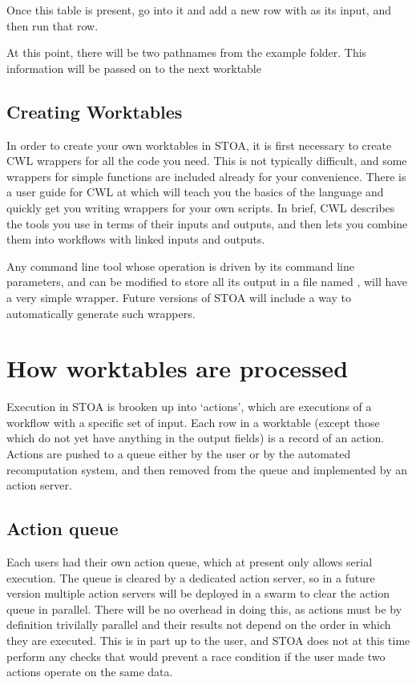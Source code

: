 \documentclass[letterpaper,10pt,english]{sphinxmanual}
\begin{document}
Once this table is present, go into it and add a new row with  as its input, and then run that row.

\noindent{}

At this point, there will be two pathnames from the example folder. This information will be passed on to the next worktable


\section{Creating Worktables}
\label{\detokenize{starting:creating-worktables}}
In order to create your own worktables in STOA, it is first necessary to create CWL wrappers for all the code you need. This is not typically difficult, and some wrappers for simple functions are included already for your convenience. There is a user guide for CWL at  which will teach you the basics of the language and quickly get you writing wrappers for your own scripts. In brief, CWL describes the tools you use in terms of their inputs and outputs, and then lets you combine them into workflows with linked inputs and outputs.

Any command line tool whose operation is driven by its command line parameters, and can be modified to store all its output in a file named , will have a very simple wrapper. Future versions of STOA will include a way to automatically generate such wrappers.


\chapter{How worktables are processed}
\label{\detokenize{process:how-worktables-are-processed}}\label{\detokenize{process::doc}}
Execution in STOA is brooken up into ‘actions’, which are executions of a workflow with a specific set of input. Each row in a worktable (except those which do not yet have anything in the output fields) is a record of an action. Actions are pushed to a queue either by the user or by the automated recomputation system, and then removed from the queue and implemented by an action server.


\section{Action queue}
\label{\detokenize{process:action-queue}}
Each users had their own action queue, which at present only allows serial execution. The queue is cleared by a dedicated action server, so in a future version multiple action servers will be deployed in a swarm to clear the action queue in parallel. There will be no overhead in doing this, as actions must be by definition trivilally parallel and their results not depend on the order in which they are executed. This is in part up to the user, and STOA does not at this time perform any checks that would prevent a race condition if the user made two actions operate on the same data.
\end{document}
